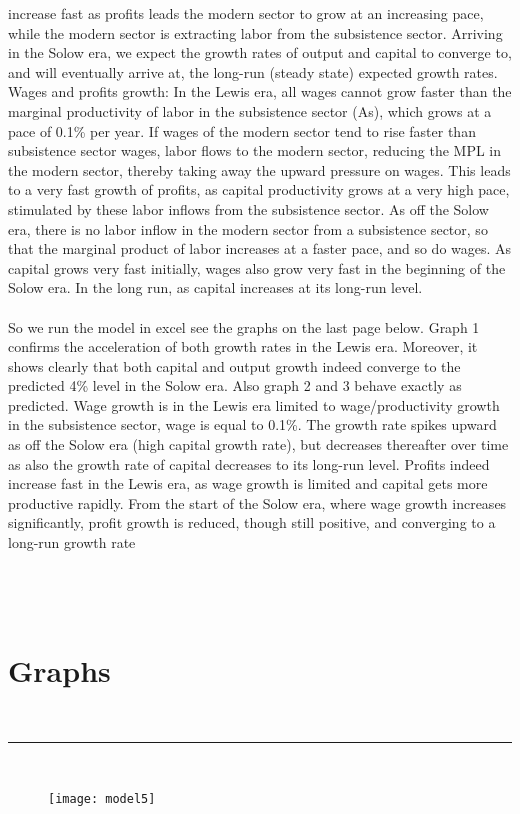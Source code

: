 \documentclass[10pnt]{article}
\begin{document}
	increase fast as profits leads the modern sector to grow at an increasing pace, while the modern sector is extracting labor from the subsistence sector.  Arriving in the Solow era, we expect the growth rates of output and capital to converge to, and will eventually arrive at, the long-run (steady state) expected growth rates.
	Wages and profits growth: In the Lewis era, all wages cannot grow faster than the marginal productivity of labor in the subsistence sector (As), which grows at a pace of 0.1\% per year. If wages of the modern sector tend to rise faster than subsistence sector wages, labor flows to the modern sector, reducing the MPL in the modern sector, thereby taking away the upward pressure on wages. This leads to a very fast growth of profits, as capital productivity grows at a very high pace, stimulated by these labor inflows from the subsistence sector. As off the Solow era, there is no labor inflow in the modern sector from a subsistence sector, so that the marginal product of labor increases at a faster pace, and so do wages. As capital grows very fast initially, wages also grow very fast in the beginning of the Solow era. In the long run, as capital increases at its long-run level.
\\
\\	
	So we run the model in excel see the graphs on the last page below. 
	Graph 1 confirms the acceleration of both growth rates in the Lewis era. Moreover, it shows clearly that both capital and output growth indeed converge to the predicted 4\% level in the Solow era. Also graph 2 and 3 behave exactly as predicted.
	Wage growth is in the Lewis era limited to wage/productivity growth in the subsistence sector, wage is equal to 0.1\%. The growth rate spikes upward as off the Solow era (high capital growth rate), but decreases thereafter over time as also the growth rate of capital decreases to its long-run level.  Profits indeed increase fast in the Lewis era, as wage growth is limited and capital gets more productive rapidly. From the start of the Solow era, where wage growth increases significantly, profit growth is reduced, though still positive, and converging to a long-run growth rate
\\
\\		
\\
\\
{\Large\chapter{Graphs}}
\\
\noindent\rule{8cm}{0.4pt}
\\
	\begin{figure}[h]
		\centering
		\texttt{[image: model5]}
		\label{fig:table 1}
	\end{figure}
	
\end{document}
